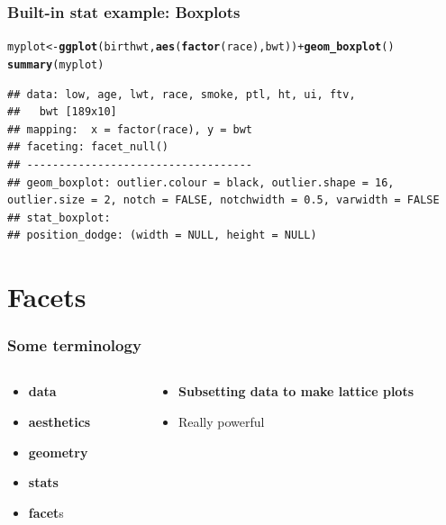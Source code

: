 \documentclass{beamer}\usepackage[]{graphicx}\usepackage[]{color}
\makeatletter
\newcommand{\hlopt}[1]{\textcolor[rgb]{0,0,0}{#1}}%
\newcommand{\hlstd}[1]{\textcolor[rgb]{0.345,0.345,0.345}{#1}}%
\newcommand{\hlkwb}[1]{\textcolor[rgb]{0.69,0.353,0.396}{#1}}%
\newcommand{\hlkwd}[1]{\textcolor[rgb]{0.737,0.353,0.396}{\textbf{#1}}}%
\newenvironment{kframe}{%
 \def\at@end@of@kframe{}%
 \ifinner\ifhmode%
  \def\at@end@of@kframe{\end{minipage}}%
  \begin{minipage}{\columnwidth}%
 \fi\fi%
 \def\FrameCommand##1{\hskip\@totalleftmargin \hskip-\fboxsep
 \colorbox{shadecolor}{##1}\hskip-\fboxsep
     \hskip-\linewidth \hskip-\@totalleftmargin \hskip\columnwidth}%
 \MakeFramed {\advance\hsize-\width
   \@totalleftmargin\z@ \linewidth\hsize
   \@setminipage}}%
 {\par\unskip\endMakeFramed%
 \at@end@of@kframe}
\newenvironment{knitrout}{}{} %
\makeatother
\begin{document}

\begin{frame}[fragile]
\frametitle{Built-in stat example: Boxplots}
\begin{knitrout}\footnotesize
{}\color{fgcolor}\begin{kframe}
\begin{alltt}
\hlstd{myplot} \hlkwb{<-} \hlkwd{ggplot}\hlstd{(birthwt,} \hlkwd{aes}\hlstd{(}\hlkwd{factor}\hlstd{(race), bwt))} \hlopt{+} \hlkwd{geom_boxplot}\hlstd{()}
\hlkwd{summary}\hlstd{(myplot)}
\end{alltt}
\begin{verbatim}
## data: low, age, lwt, race, smoke, ptl, ht, ui, ftv,
##   bwt [189x10]
## mapping:  x = factor(race), y = bwt
## faceting: facet_null() 
## -----------------------------------
## geom_boxplot: outlier.colour = black, outlier.shape = 16, outlier.size = 2, notch = FALSE, notchwidth = 0.5, varwidth = FALSE 
## stat_boxplot:  
## position_dodge: (width = NULL, height = NULL)
\end{verbatim}
\end{kframe}
\end{knitrout}
\end{frame}


\section*{Facets}
\frame{\sectionpage}



\begin{frame}[fragile]
\frametitle{Some terminology}
\begin{columns}[t]

\begin{column}[T]{3cm}
\begin{itemize}
    \item \textbf{\color{gray}data}
    \item \textbf{\color{gray}aesthetics}
    \item \textbf{\color{gray}geometry}
    \item \textbf{\color{gray}stats}
    \item \textbf{facet}s
\end{itemize}
\end{column}

\begin{column}[T]{8cm}
\begin{itemize}
    \item \textbf{Subsetting data to make lattice plots}
    \item Really powerful
\end{itemize}
\end{column}

\end{columns}
\end{frame}
\end{document}
